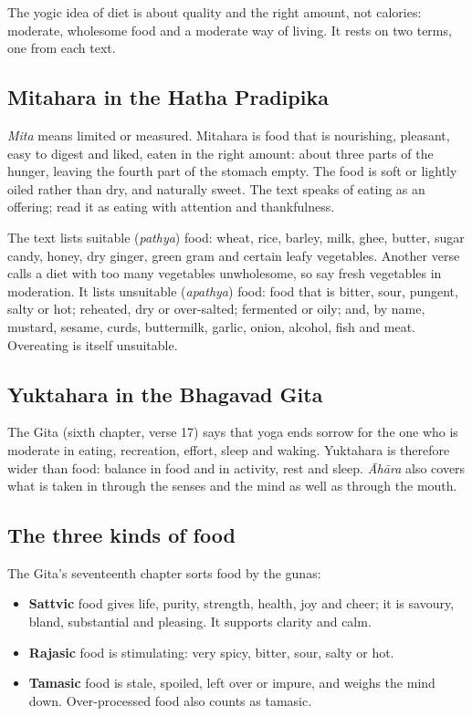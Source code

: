 The yogic idea of diet is about quality and the right amount, not calories: moderate, wholesome food and a moderate way of living. It rests on two terms, one from each text.

\subsection*{Mitahara in the Hatha Pradipika}
\emph{Mita} means limited or measured. Mitahara is food that is nourishing, pleasant, easy to digest and liked, eaten in the right amount: about three parts of the hunger, leaving the fourth part of the stomach empty. The food is soft or lightly oiled rather than dry, and naturally sweet. The text speaks of eating as an offering; read it as eating with attention and thankfulness.

The text lists suitable (\emph{pathya}) food: wheat, rice, barley, milk, ghee, butter, sugar candy, honey, dry ginger, green gram and certain leafy vegetables. Another verse calls a diet with too many vegetables unwholesome, so say fresh vegetables in moderation. It lists unsuitable (\emph{apathya}) food: food that is bitter, sour, pungent, salty or hot; reheated, dry or over-salted; fermented or oily; and, by name, mustard, sesame, curds, buttermilk, garlic, onion, alcohol, fish and meat. Overeating is itself unsuitable.

\subsection*{Yuktahara in the Bhagavad Gita}
The Gita (sixth chapter, verse 17) says that yoga ends sorrow for the one who is moderate in eating, recreation, effort, sleep and waking. Yuktahara is therefore wider than food: balance in food and in activity, rest and sleep. \emph{Āhāra} also covers what is taken in through the senses and the mind as well as through the mouth.

\subsection*{The three kinds of food}
The Gita's seventeenth chapter sorts food by the gunas:
\begin{itemize}
\item \textbf{Sattvic} food gives life, purity, strength, health, joy and cheer; it is savoury, bland, substantial and pleasing. It supports clarity and calm.
\item \textbf{Rajasic} food is stimulating: very spicy, bitter, sour, salty or hot.
\item \textbf{Tamasic} food is stale, spoiled, left over or impure, and weighs the mind down. Over-processed food also counts as tamasic.
\end{itemize}

